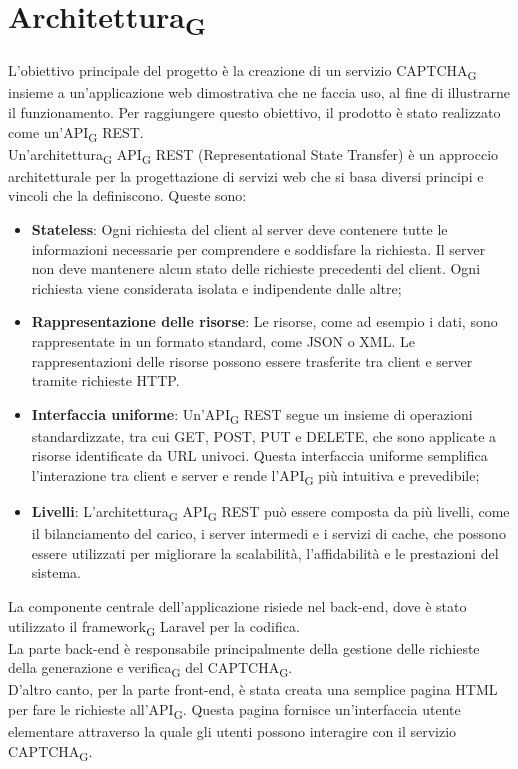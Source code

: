 \section{Architettura\textsubscript{G}}
L'obiettivo principale del progetto è la creazione di un servizio CAPTCHA\textsubscript{G} insieme a un'applicazione web 
dimostrativa che ne faccia uso, al fine di illustrarne il funzionamento. Per raggiungere questo obiettivo, 
il prodotto è stato realizzato come un'API\textsubscript{G} REST.\\
Un'architettura\textsubscript{G} API\textsubscript{G} REST (Representational State Transfer) è un approccio architetturale per la progettazione di servizi web che si basa diversi principi e vincoli che la definiscono.
Queste sono:
\begin{itemize}
	\item \textbf{Stateless}: Ogni richiesta del client al server deve contenere tutte le informazioni necessarie per comprendere e soddisfare la richiesta. Il server non deve mantenere alcun stato delle richieste precedenti del client. Ogni richiesta viene considerata isolata e indipendente dalle altre;
	\item \textbf{Rappresentazione delle risorse}: Le risorse, come ad esempio i dati, sono rappresentate in un formato standard, come JSON o XML. Le rappresentazioni delle risorse possono essere trasferite tra client e server tramite richieste HTTP.
	\item \textbf{Interfaccia uniforme}:  Un'API\textsubscript{G} REST segue un insieme di operazioni standardizzate, tra cui GET, POST, PUT e DELETE, che sono applicate a risorse identificate da URL univoci. Questa interfaccia uniforme semplifica l'interazione tra client e server e rende l'API\textsubscript{G} più intuitiva e prevedibile;
	\item \textbf{Livelli}:  L'architettura\textsubscript{G} API\textsubscript{G} REST può essere composta da più livelli, come il bilanciamento del carico, i server intermedi e i servizi di cache, che possono essere utilizzati per migliorare la scalabilità, l'affidabilità e le prestazioni del sistema.\\
\end{itemize}

La componente centrale dell'applicazione risiede nel back-end, dove è stato utilizzato il framework\textsubscript{G} Laravel per la codifica.\\
La parte back-end è responsabile principalmente della gestione delle richieste della generazione e verifica\textsubscript{G} del CAPTCHA\textsubscript{G}. \\
D'altro canto, per la parte front-end, è stata creata una semplice pagina HTML per fare le richieste all'API\textsubscript{G}. Questa pagina fornisce un'interfaccia utente elementare attraverso la quale gli utenti possono interagire con il servizio CAPTCHA\textsubscript{G}.

